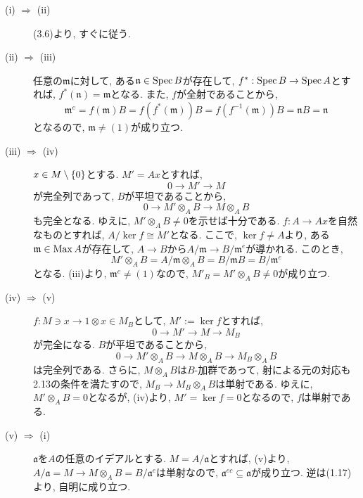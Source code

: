 \documentclass[dvipdfmx]{jsarticle}
\begin{document}
    \setcounter{BaseCounter}{17}
    \begin{problem}
        \begin{description}
            \item[(i) $\Rightarrow$ (ii)]
                (3.6)より, すぐに従う.
            \item[(ii) $\Rightarrow$ (iii)]
                任意の$\mathfrak{m}$に対して, ある$\mathfrak{n} \in \operatorname{Spec}{B}$が存在して,
                $f^\ast: \operatorname{Spec}{B} \to \operatorname{Spec}{A}$とすれば,
                $f^\ast(\mathfrak{n}) = \mathfrak{m}$となる.
                また, $f$が全射であることから,
                \[
                    \mathfrak{m}^e = f(\mathfrak{m})B = f(f^\ast(\mathfrak{m}))B = f(f^{-1}(\mathfrak{m}))B = \mathfrak{n}B = \mathfrak{n}
                \]
                となるので, $\mathfrak{m} \neq (1)$が成り立つ.
            \item[(iii) $\Rightarrow$ (iv)]
                $x \in M \setminus \{0\}$とする.
                $M' = Ax$とすれば,
                \[
                    0 \longrightarrow M' \longrightarrow M
                \]
                が完全列であって, $B$が平坦であることから,
                \[
                    0 \longrightarrow M' \otimes_A B \longrightarrow M \otimes_A B
                \]
                も完全となる.
                ゆえに, $M' \otimes_A B \neq 0$を示せば十分である.
                $f: A \to Ax$を自然なものとすれば, $A/\ker{f} \cong M'$となる.
                ここで, $\ker{f} \neq A$より, ある$\mathfrak{m} \in \operatorname{Max}{A}$が存在して,
                $A \to B$から$A/\mathfrak{m} \to B/\mathfrak{m}^e$が導かれる.
                このとき,
                \[
                    M' \otimes_A B = A/\mathfrak{m} \otimes_A B = B/\mathfrak{m}B = B/\mathfrak{m}^e
                \]
                となる.
                (iii)より, $\mathfrak{m}^c \neq (1)$なので,
                $M'_B = M' \otimes_A B \neq 0$が成り立つ.
            \item[(iv) $\Rightarrow$ (v)]
            $f: M \ni x \to 1 \otimes x \in M_B$として, $M' := \ker{f}$とすれば,
            \[
                0 \longrightarrow M' \longrightarrow M \longrightarrow M_B
            \]
            が完全になる.
            $B$が平坦であることから,
            \[
                0 \longrightarrow M' \otimes_A B \longrightarrow M \otimes_A B \longrightarrow M_B \otimes_A B
            \]
            は完全列である.
            さらに, $M \otimes_A B$は$B$-加群であって, 射による元の対応も2.13の条件を満たすので,
            $M_B \to M_B \otimes_A B$は単射である.
            ゆえに, $M'\otimes_A B = 0$となるが, (iv)より, $M' = \ker{f} = 0$となるので, $f$は単射である.
        \item[(v) $\Rightarrow$ (i)]
            $\mathfrak{a}$を$A$の任意のイデアルとする.
            $M = A/\mathfrak{a}$とすれば, (v)より, $A/\mathfrak{a} = M \to M \otimes_A B = B/\mathfrak{a}^e$は単射なので,
            $\mathfrak{a}^{ec} \subseteq \mathfrak{a}$が成り立つ.
            逆は(1.17)より, 自明に成り立つ.
        \end{description}
    \end{problem}
\end{document}
